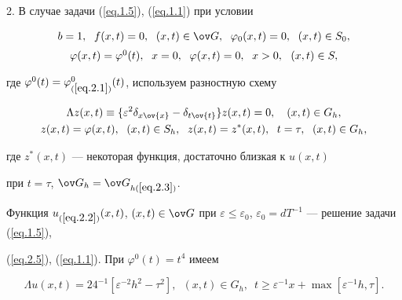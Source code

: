 2. В случае задачи (\ref{eq.1.5}), (\ref{eq.1.1}) при условии


\begin{equation} \label{eq.2.5}


\begin{array}{c}


b=1, \ \; f(x, t)=0, \ \; (x, t)\in \ov G, \ \; \varphi_0(x, t)=0, \ \; (x,


t)\in S_0,\\[2mm]


\varphi(x, t)=\varphi^0(t), \ \; x=0, \ \; \varphi(x, t)=0, \ \; x> 0,


\ \ (x,t)\in S,


\end{array}


\end{equation}


где $\varphi^0(t)=\varphi^0_{(\ref{eq.2.1})}(t)$, используем разностную схему


\begin{gather*}


\Lambda z(x, t)\equiv \{\varepsilon^2


\delta_{x\ov{x}}-\delta_{t\ov{t}}\} z(x, t)=0, \quad (x, t)\in G_h, \\


z(x, t)=\varphi(x, t), \ \; (x, t)\in S_h,\ \;


z(x, t)=z^*(x, t), \ \; t=\tau, \ \; (x, t)\in G_h,


\end{gather*}


где $z^*(x, t)$ --- некоторая функция, достаточно близкая к $u(x, t)$


при $t=\tau$, $\ov G_h=\ov G_{h(\ref{eq.2.3})}$.





Функция $u_{(\ref{eq.2.2})}(x, t)$, $(x, t)\in \ov G$ при $\varepsilon\le


\varepsilon_0$, $\varepsilon_0=d T^{-1}$ --- решение задачи (\ref{eq.1.5}),


(\ref{eq.2.5}), (\ref{eq.1.1}). При $\varphi^0(t)=t^4$ имеем


$$


\Lambda u(x, t)=2 4^{-1} [\varepsilon^{-2} h^2-\tau^2],


\ \; (x, t)\in G_h, \ \;


t\ge \varepsilon^{-1} x+\max [\varepsilon^{-1} h, \tau].


$$


